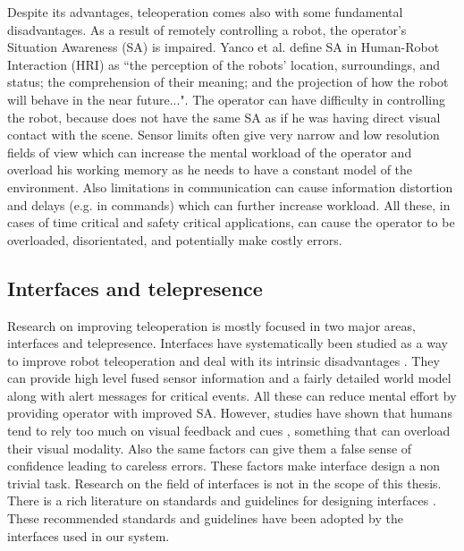 \documentclass[a4paper,12pt,oneside,openright]{bhamthesis}
\begin{document}
Despite its advantages, teleoperation comes also with some fundamental disadvantages. As a result of remotely controlling a robot, the operator's Situation Awareness (SA) is impaired. Yanco et al. \citep{Yanco_HRI_SA_04} define SA in Human-Robot Interaction (HRI) as ``the perception of the robots' location, surroundings, and status; the comprehension of their meaning; and the projection of how the robot will behave in the near future...". The operator can have difficulty in controlling the robot, because does not have the same SA as if he was having direct visual contact with the scene. Sensor limits often give very narrow and low resolution fields of view which can increase the mental workload of the operator and overload his working memory as he needs to have a constant model of the environment. Also limitations in communication can cause information distortion and delays \citep{Hokayem2006} (e.g. in commands) which can further increase workload. All these, in cases of time critical and safety critical applications, can cause the operator to be overloaded, disorientated, and potentially make costly errors.

\subsection{Interfaces and telepresence}
Research on improving teleoperation is mostly focused in two major areas, interfaces and telepresence. Interfaces have systematically been studied as a way to improve robot teleoperation and deal with its intrinsic disadvantages \citep{Chen2007}. They can provide high level fused sensor information and a fairly detailed world model along with alert messages for critical events. All these can reduce mental effort by providing operator with improved SA. However, studies have shown that humans tend to rely too much on visual feedback and cues \citep{Yanco2006,Baker2004}, something that can overload their visual modality. Also the same factors can give them a false sense of confidence leading to careless errors. These factors make interface design a non trivial task. Research on the field of interfaces is not in the scope of this thesis. There is a rich literature on standards and guidelines for designing interfaces \citep{Yanco2004,Scholtz2004a,Nielsen2007a}. These recommended standards and guidelines have been adopted by the interfaces used in our system.
\end{document}

